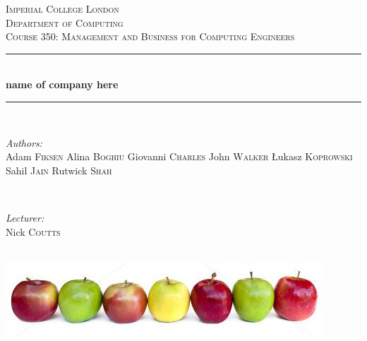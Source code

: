 \documentclass{article}
\begin{document}

\begin{titlepage}
\newcommand{\HRule}{\rule{\linewidth}{0.5mm}}
\center
\textsc{\LARGE Imperial College London}  \\[1.5cm]
\textsc{\Large Department of Computing}  \\[0.5cm]
\textsc{\large Course 350: Management and Business for Computing Engineers} \\[0.5cm]

\HRule \\[0.6cm]
{\huge \bfseries name of company here} \\[0.3cm]
\HRule \\[1.5cm]

\begin{minipage}{0.4\textwidth}

\begin{flushleft} \large \emph{Authors:} \\
Adam  \textsc{Fiksen}
Alina  \textsc{Boghiu}
Giovanni  \textsc{Charles}
John  \textsc{Walker}
\L ukasz \textsc{Koprowski}
Sahil  \textsc{Jain}
Rutwick  \textsc{Shah}
\end{flushleft}

\end{minipage}~
\begin{minipage}{0.4\textwidth}

\begin{flushright} \large \emph{Lecturer:} \\
Nick \textsc{Coutts}
\end{flushright}


\end{minipage}\\[4cm]

\includegraphics[width=\textwidth]{apples.jpg}

\end{titlepage}

\end{document}
